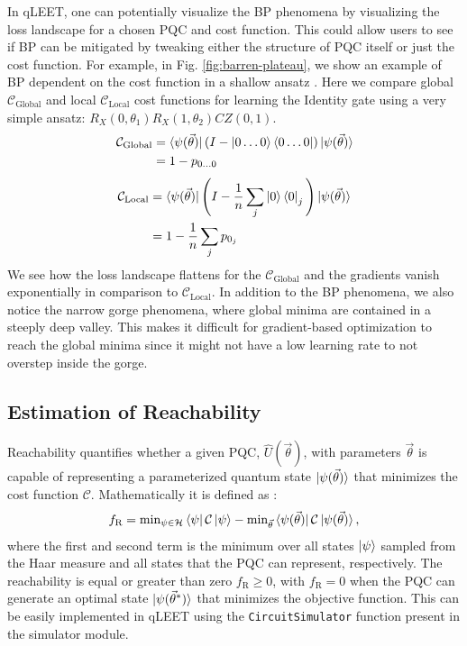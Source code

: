 \documentclass[%
 reprint,
 amsmath,
 amssymb,
 showkeys,
 pra,
 floatfix,
]{revtex4-2}
\begin{document}
In qLEET, one can potentially visualize the BP phenomena by visualizing the loss landscape for a chosen PQC and cost function. This could allow users to see if BP can be mitigated by tweaking either the structure of PQC itself or just the cost function. For example, in Fig. \ref{fig:barren-plateau}, we show an example of BP dependent on the cost function in a shallow ansatz \cite{s41467-021-21728-w}. Here we compare global $\mathcal{C}_{\text{Global}}$ and local $\mathcal{C}_{\text{Local}}$ cost functions for learning the Identity gate using a very simple ansatz: $R_X(0,\theta_1)R_X(1, \theta_2)CZ(0, 1)$. 
\begin{equation}
\begin{split}
    \mathcal{C}_{\text{Global}} &= \bra{\psi(\vec{\theta})} (I - \ket{0\ldots0}\bra{0\ldots0}) \ket{\psi(\vec{\theta})} \\
    &= 1 - p_{0\ldots0}
\end{split}
\end{equation}
\begin{equation}
\begin{split}
    \mathcal{C}_{\text{Local}} &= \bra{\psi(\vec{\theta})} \Bigg(I - \frac{1}{n}\sum_j \ket{0}\bra{0}_j\Bigg) \ket{\psi(\vec{\theta})} \\
    &= 1 - \frac{1}{n}\sum_j p_{0_j}
\end{split}
\end{equation}
We see how the loss landscape flattens for the $\mathcal{C}_{\text{Global}}$ and the gradients vanish exponentially in comparison to  $\mathcal{C}_{\text{Local}}$. In addition to the BP phenomena, we also notice the narrow gorge phenomena, where global minima are contained in a steeply deep valley. This makes it difficult for gradient-based optimization to reach the global minima since it might not have a low learning rate to not overstep inside the gorge. 

\subsection{Estimation of Reachability}

Reachability quantifies whether a given PQC, $\hat{U}(\vec{\theta})$, with parameters $\vec{\theta}$ is capable of representing a parameterized quantum state $\ket{\psi(\vec{\theta})}$ that minimizes the cost function $\mathcal{C}$. Mathematically it is defined as \cite{PhysRevLett.124.090504}:
\begin{equation}
f_\text{R}=\text{min}_{\psi\in\mathcal{H}}\bra{\psi}\mathcal{C}\ket{\psi}-\text{min}_{\vec{\theta}}\bra{\psi(\vec{\theta})}\mathcal{C}\ket{\psi(\vec{\theta})},
\end{equation}
where the first and second term is the minimum over all states $\ket{\psi}$ sampled from the Haar measure and all states that the PQC can represent, respectively. The reachability is equal or greater than zero $f_\text{R}\ge0$, with $f_\text{R}=0$ when the PQC can generate an optimal state $\ket{\psi(\vec{\theta}^*)}$ that minimizes the objective function. This can be easily implemented in qLEET using the \texttt{CircuitSimulator} function present in the simulator module.  
\end{document}
